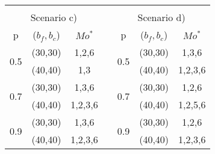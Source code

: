 \begin{table}[]
{\begin{tabular}{ccccccc}
                                           &                                  &                              &                       &                                           &                                  &                              \\
\multicolumn{3}{c}{Scenario c)}                                                                              &                       & \multicolumn{3}{c}{Scenario d)}                                                                             \\ \cline{1-3} \cline{5-7} 
\multicolumn{1}{|c|}{p}                    & \multicolumn{1}{c|}{($b_f,b_c$)} & \multicolumn{1}{c|}{$Mo^*$}  & \multicolumn{1}{c|}{} & \multicolumn{1}{c|}{p}                    & \multicolumn{1}{c|}{($b_f,b_c$)} & \multicolumn{1}{c|}{$Mo^*$}  \\ \cline{1-3} \cline{5-7} 
\multicolumn{1}{|c|}{\multirow{2}{*}{0.5}} & \multicolumn{1}{c|}{(30,30)}     & \multicolumn{1}{c|}{1,2,6}   & \multicolumn{1}{c|}{} & \multicolumn{1}{c|}{\multirow{2}{*}{0.5}} & \multicolumn{1}{c|}{(30,30)}     & \multicolumn{1}{c|}{1,3,6}   \\ \cline{2-3} \cline{6-7} 
\multicolumn{1}{|c|}{}                     & \multicolumn{1}{c|}{(40,40)}     & \multicolumn{1}{c|}{1,3}     & \multicolumn{1}{c|}{} & \multicolumn{1}{c|}{}                     & \multicolumn{1}{c|}{(40,40)}     & \multicolumn{1}{c|}{1,2,3,6} \\ \cline{1-3} \cline{5-7} 
\multicolumn{1}{|c|}{\multirow{2}{*}{0.7}} & \multicolumn{1}{c|}{(30,30)}     & \multicolumn{1}{c|}{1,3,6}   & \multicolumn{1}{c|}{} & \multicolumn{1}{c|}{\multirow{2}{*}{0.7}} & \multicolumn{1}{c|}{(30,30)}     & \multicolumn{1}{c|}{1,2,6}   \\ \cline{2-3} \cline{6-7} 
\multicolumn{1}{|c|}{}                     & \multicolumn{1}{c|}{(40,40)}     & \multicolumn{1}{c|}{1,2,3,6} & \multicolumn{1}{c|}{} & \multicolumn{1}{c|}{}                     & \multicolumn{1}{c|}{(40,40)}     & \multicolumn{1}{c|}{1,2,5,6} \\ \cline{1-3} \cline{5-7} 
\multicolumn{1}{|c|}{\multirow{2}{*}{0.9}} & \multicolumn{1}{c|}{(30,30)}     & \multicolumn{1}{c|}{1,3,6}   & \multicolumn{1}{c|}{} & \multicolumn{1}{c|}{\multirow{2}{*}{0.9}} & \multicolumn{1}{c|}{(30,30)}     & \multicolumn{1}{c|}{1,2,6}   \\ \cline{2-3} \cline{6-7} 
\multicolumn{1}{|c|}{}                     & \multicolumn{1}{c|}{(40,40)}     & \multicolumn{1}{c|}{1,2,3,6} & \multicolumn{1}{c|}{} & \multicolumn{1}{c|}{}                     & \multicolumn{1}{c|}{(40,40)}     & \multicolumn{1}{c|}{1,2,3,6} \\ \cline{1-3} \cline{5-7} 

\end{tabular}}
\end{table}
